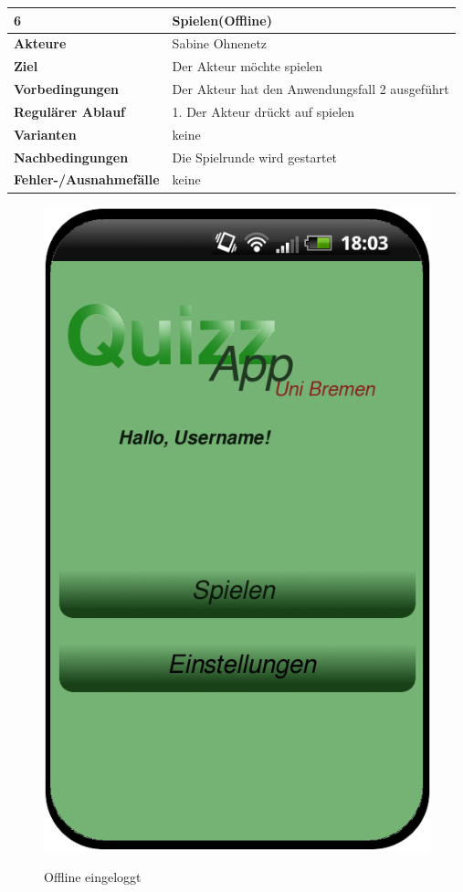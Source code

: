 \documentclass[fontsize=12pt,paper=a4,twoside]{scrartcl}
\begin{document}
\begin{table}
	[H] \label{6} 
	\begin{tabular}
		{|l|p{10cm}|} \hline \textbf{6} & \textbf{Spielen(Offline)} \\
		\hline \textbf{Akteure} & Sabine Ohnenetz\\
		\hline \textbf{Ziel} & Der Akteur möchte spielen\\
		\hline \textbf{Vorbedingungen} & Der Akteur hat den Anwendungsfall 2 ausgeführt \\
		\hline \textbf{Regulärer Ablauf} & 1. Der Akteur drückt auf spielen \\
		\hline \textbf{Varianten} & keine \\
		\hline \textbf{Nachbedingungen} & Die Spielrunde wird gestartet\\
		\hline \textbf{Fehler-/Ausnahmefälle} & keine \\
		\hline 
	\end{tabular}
\end{table}

\begin{figure}
	[H] \caption{Offline eingeloggt} 
	\includegraphics[width=0.5
	\textwidth]{Bilder/QuizzLoginSuccessfullyOFFLINE.png} \label{pic:Startseite} 
\end{figure}
\end{document}
